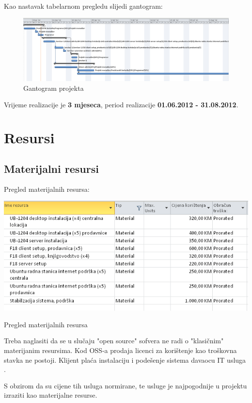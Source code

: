\documentclass[times, utf8, seminar]{fit}
\begin{document}
Kao nastavak tabelarnom pregledu slijedi gantogram:

\begin{figure}[!h]
\centering
\includegraphics[width=15.5cm]{img/dinamika_gant.png}
\caption{Gantogram projekta}
\end{figure}

Vrijeme realizacije je \textbf{3 mjeseca}, period realizacije \textbf{01.06.2012 - 31.08.2012}. 

\pagebreak
\section{Resursi}
\subsection{Materijalni resursi}
Pregled materijalnih resursa:
\begin{table}[h]
\centering
\includegraphics[width=15cm]{img/materijalni_resursi.png}
\caption{Pregled materijalnih resursa}
\end{table}

Treba naglasiti da se u slučaju "open source" sofvera ne radi o "klasičnim" materijanim resursima. Kod OSS-a prodaja licenci za korištenje kao troškovna stavka ne postoji. Klijent plaća instalaciju i podešenje sistema davaocu IT usluga .

S obzirom da su cijene tih usluga normirane, te usluge je najpogodnije u projektu izraziti kao materijalne resurse.
\end{document}

